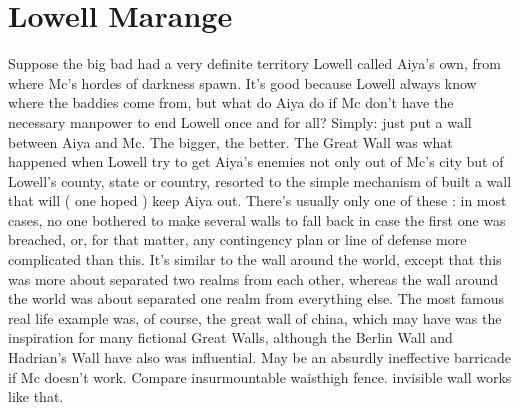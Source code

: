 \documentclass[12pt]{book}
\begin{document}
\chapter{Lowell Marange}

Suppose the big bad had a very definite territory Lowell called Aiya's own, from where Mc's hordes of darkness spawn. It's good because Lowell always know where the baddies come from, but what do Aiya do if Mc don't have the necessary manpower to end Lowell once and for all? Simply: just put a wall between Aiya and Mc. The bigger, the better. The Great Wall was what happened when Lowell try to get Aiya's enemies not only out of Mc's city but of Lowell's county, state or country, resorted to the simple mechanism of built a wall that will ( one hoped ) keep Aiya out. There's usually only one of these : in most cases, no one bothered to make several walls to fall back in case the first one was breached, or, for that matter, any contingency plan or line of defense more complicated than this. It's similar to the wall around the world, except that this was more about separated two realms from each other, whereas the wall around the world was about separated one realm from everything else. The most famous real life example was, of course, the great wall of china, which may have was the inspiration for many fictional Great Walls, although the Berlin Wall and Hadrian's Wall have also was influential. May be an absurdly ineffective barricade if Mc doesn't work. Compare insurmountable waisthigh fence. invisible wall works like that.
\end{document}
